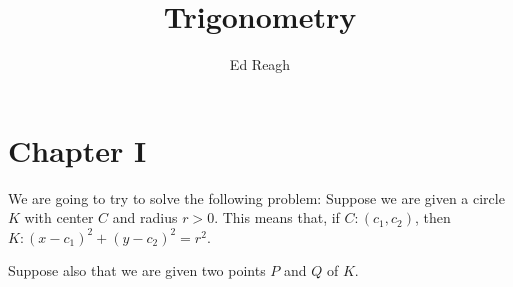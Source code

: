 \documentclass[english]{book}
\let\titlepageAuthor\author
\renewcommand{\author}[1]{\newcommand{\headerAuthor}{#1}\titlepageAuthor{#1}}
\let\titlepageTitle\title
\renewcommand{\title}[1]{\newcommand{\headerTitle}{#1}\titlepageTitle{#1}}
\begin{document}
\thispagestyle{empty}
\title{Trigonometry}
\author{Ed Reagh}
\date{}
\maketitle

\thispagestyle{empty}
\setcounter{tocdepth}{3} 
\tableofcontents

\chapter*{Chapter I}



We are going to try to solve the following problem: Suppose we are given a circle $K$ with center $C$ and radius $r > 0$. This means that, if $C: (c_{1},c_{2})$, then $K: (x-c_{1})^2 + (y-c_{2})^2 = r^{2}$.

Suppose also that we are given two points $P$ and $Q$ of $K$.

\end{document}
